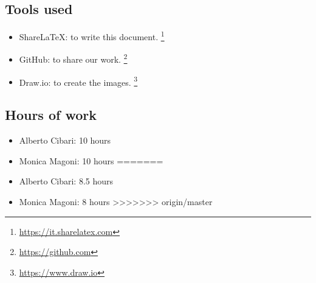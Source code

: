 \subsection*{Tools used}
    \begin{itemize}
        \item ShareLaTeX: to write this document.
        \footnote{\url{https://it.sharelatex.com}}
        \item GitHub: to share our work. \footnote{\url{https://github.com}} 
        \item Draw.io: to create the images.
        \footnote{\url{https://www.draw.io}}
    \end{itemize}
    
\subsection*{Hours of work}
    \begin{itemize}
<<<<<<< HEAD
    \item Alberto Cibari: 10 hours
    \item Monica Magoni: 10 hours
=======
    \item Alberto Cibari: 8.5 hours
    \item Monica Magoni: 8 hours
>>>>>>> origin/master
    \end{itemize}